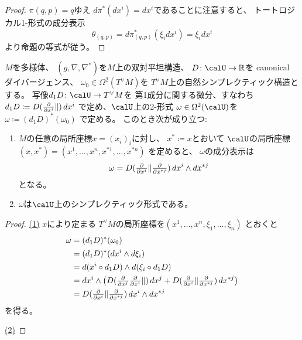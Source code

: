 \documentclass[report]{jlreq}
\begin{document}
\begin{proof}
    $\pi(q, p) = q$ゆえ
    $d\pi^* (dx^i) = dx^i$であることに注意すると、
    トートロジカル1-形式の成分表示
    \begin{equation}
        \theta_{(q, p)}
            =
                d\pi_{(q, p)}^* (\xi_i dx^i)
            =
                \xi_i dx^i
    \end{equation}
    より命題の等式が従う。
\end{proof}

\begin{proposition}[双対平坦構造のシンプレクティック構造]
    $M$を多様体、
    $(g, \nabla, \nabla^*)$を$M$上の双対平坦構造、
    $D \colon \calU \to \R$を canonical ダイバージェンス、
    $\omega_0 \in \Omega^2(T^\vee M)$を
    $T^\vee M$上の自然シンプレクティック構造とする。
    写像$d_1 D \colon \calU \to T^\vee M$を
    第1成分に関する微分、すなわち
    $d_1 D \coloneqq D(\tdeldel{x^i} \|) \, dx^i$
    で定め、$\calU$上の2-形式
    $\omega \in \Omega^2(\calU)$を
    $\omega \coloneqq (d_1 D)^* (\omega_0)$
    で定める。
    このとき次が成り立つ:
    \begin{enumerate}
        \item $M$の任意の局所座標$x = (x_i)_i$に対し、
            $x^* \coloneqq x$とおいて
            $\calU$の局所座標$(x, x^*) = (x^1, \dots, x^n, x^{*1}, \dots, x^{*n})$
            を定めると、
            $\omega$の成分表示は
            \begin{equation}
                \omega
                    =
                        D(\tdeldel{x^i} \| \tdeldel{x^{*j}}) \,
                        dx^i \wedge dx^{*j}
            \end{equation}
            となる。
        \item $\omega$は$\calU$上のシンプレクティック形式である。
    \end{enumerate}
\end{proposition}

\begin{proof}
    \uline{(1)} \quad
    $x$により定まる
    $T^\vee M$の局所座標を$(x^1, \dots, x^n, \xi_1, \dots, \xi_n)$
    とおくと
    \begin{alignat}{1}
        \omega
            &=
                (d_1 D)^* (\omega_0)
                \\
            &=
                (d_1 D)^* (dx^i \wedge d\xi_i)
                \\
            &=
                d(x^i \circ d_1 D) \wedge d(\xi_i \circ d_1 D)
                \\
            &=
                dx^i \wedge \myparen{
                    D(\tdeldel{x^j} \tdeldel{x^i} \|) \, dx^j
                    +
                    D(\tdeldel{x^i} \| \tdeldel{x^{*j}}) \, dx^{*j}
                }
                \\
            &=
                D(\tdeldel{x^i} \| \tdeldel{x^{*j}}) \,
                dx^i \wedge dx^{*j}
    \end{alignat}
    を得る。

    \uline{(2)} \quad
\end{proof}
\end{document}
